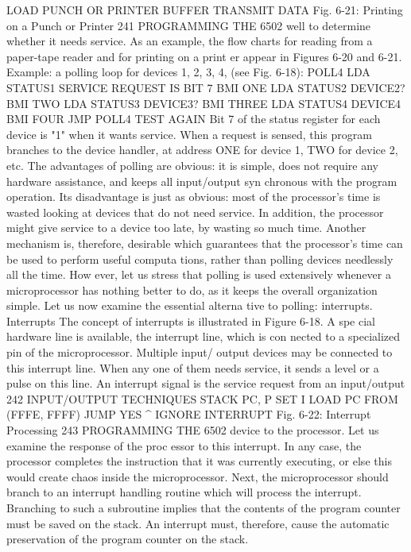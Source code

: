 LOAD PUNCH
OR PRINTER
BUFFER
TRANSMIT
DATA
Fig. 6-21: Printing on a Punch or Printer
241
PROGRAMMING THE 6502
well to determine whether it needs service. As an example, the flow
charts for reading from a paper-tape reader and for printing on a print
er appear in Figures 6-20 and 6-21.
Example: a polling loop for devices 1, 2, 3, 4, (see Fig. 6-18):
POLL4 LDA STATUS1 SERVICE REQUEST IS BIT 7
BMI ONE
LDA STATUS2 DEVICE2?
BMI TWO
LDA STATUS3 DEVICE3?
BMI THREE
LDA STATUS4 DEVICE4
BMI FOUR
JMP POLL4 TEST AGAIN
Bit 7 of the status register for each device is "1" when it wants
service. When a request is sensed, this program branches to the
device handler, at address ONE for device 1, TWO for device 2, etc.
The advantages of polling are obvious: it is simple, does not
require any hardware assistance, and keeps all input/output syn
chronous with the program operation. Its disadvantage is just as
obvious: most of the processor's time is wasted looking at devices
that do not need service. In addition, the processor might give
service to a device too late, by wasting so much time.
Another mechanism is, therefore, desirable which guarantees
that the processor's time can be used to perform useful computa
tions, rather than polling devices needlessly all the time. How
ever, let us stress that polling is used extensively whenever a
microprocessor has nothing better to do, as it keeps the overall
organization simple. Let us now examine the essential alterna
tive to polling: interrupts.
Interrupts
The concept of interrupts is illustrated in Figure 6-18. A spe
cial hardware line is available, the interrupt line, which is con
nected to a specialized pin of the microprocessor. Multiple input/
output devices may be connected to this interrupt line. When any
one of them needs service, it sends a level or a pulse on this line.
An interrupt signal is the service request from an input/output
242
INPUT/OUTPUT TECHNIQUES
STACK PC, P
SET I
LOAD PC FROM
(FFFE, FFFF)
JUMP
YES ^ IGNORE
INTERRUPT
Fig. 6-22: Interrupt Processing
243
PROGRAMMING THE 6502
device to the processor. Let us examine the response of the proc
essor to this interrupt.
In any case, the processor completes the instruction that it was
currently executing, or else this would create chaos inside the
microprocessor. Next, the microprocessor should branch to an
interrupt handling routine which will process the interrupt. Branching
to such a subroutine implies that the contents of the program counter
must be saved on the stack. An interrupt must, therefore, cause
the automatic preservation of the program counter on the stack.
